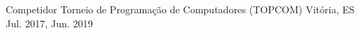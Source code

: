 \begin{cventries}
  \cventry
    {Competidor} %
    {Torneio de Programação de Computadores (TOPCOM)} %
    {Vitória, ES} %
    {Jul. 2017, Jun. 2019} %
    {
    }



 



\end{cventries}
